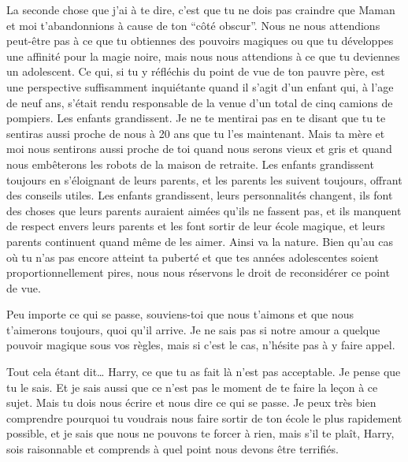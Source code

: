 \begin{writtenNote}
La seconde chose que j'ai à te dire, c'est que tu ne dois pas craindre que Maman et moi t'abandonnions à cause de ton “côté obscur”. Nous ne nous attendions peut-être pas à ce que tu obtiennes des pouvoirs magiques ou que tu développes une affinité pour la magie noire, mais nous nous attendions à ce que tu deviennes un adolescent. Ce qui, si tu y réfléchis du point de vue de ton pauvre père, est une perspective suffisamment inquiétante quand il s'agit d'un enfant qui, à l'age de neuf ans, s'était rendu responsable de la venue d'un total de cinq camions de pompiers. Les enfants grandissent. Je ne te mentirai pas en te disant que tu te sentiras aussi proche de nous à 20 ans que tu l'es maintenant. Mais ta mère et moi nous sentirons aussi proche de toi quand nous serons vieux et gris et quand nous embêterons les robots de la maison de retraite. Les enfants grandissent toujours en s'éloignant de leurs parents, et les parents les suivent toujours, offrant des conseils utiles. Les enfants grandissent, leurs personnalités changent, ils font des choses que leurs parents auraient aimées qu'ils ne fassent pas, et ils manquent de respect envers leurs parents et les font sortir de leur école magique, et leurs parents continuent quand même de les aimer. Ainsi va la nature. Bien qu'au cas où tu n'as pas encore atteint ta puberté et que tes années adolescentes soient proportionnellement pires, nous nous réservons le droit de reconsidérer ce point de vue.

Peu importe ce qui se passe, souviens-toi que nous t'aimons et que nous t'aimerons toujours, quoi qu'il arrive. Je ne sais pas si notre amour a quelque pouvoir magique sous vos règles, mais si c'est le cas, n'hésite pas à y faire appel.

Tout cela étant dit… Harry, ce que tu as fait là n'est pas acceptable. Je pense que tu le sais. Et je sais aussi que ce n'est pas le moment de te faire la leçon à ce sujet. Mais tu dois nous écrire et nous dire ce qui se passe. Je peux très bien comprendre pourquoi tu voudrais nous faire sortir de ton école le plus rapidement possible, et je sais que nous ne pouvons te forcer à rien, mais s'il te plaît, Harry, sois raisonnable et comprends à quel point nous devons être terrifiés.


\end{writtenNote}
